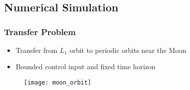 \section*{}
\subsection*{Numerical Simulation}
\begin{frame}%
\frametitle{Transfer Problem}
	\begin{itemize}
		\item Transfer from \( L_1 \) orbit to periodic orbits near the Moon
		\item Bounded control input and fixed time horizon
	\end{itemize}
	\begin{figure}
		\texttt{[image: moon\_orbit]}
	\end{figure}
	
\end{frame} %


